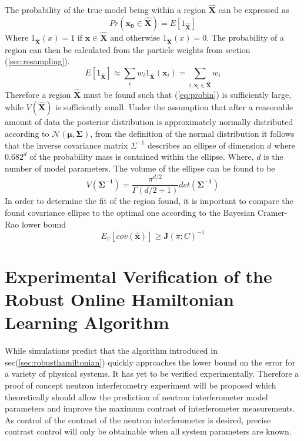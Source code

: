 The probability of the true model being within a region $\mathbf{\hat{X}}$ can be expressed as 
\begin{equation}
Pr(\mathbf{x_0}\in \mathbf{\hat{X}}) = E[1_{\mathbf{\hat{X}}}]
\end{equation}
Where $1_{\mathbf{\hat{X}}}(x) = 1$ if $\mathbf{x}\in \mathbf{\hat{X}}$ and otherwise $1_{\mathbf{\hat{X}}}(x) = 0$. 
The probability of a region can then be calculated from the particle weights from section (\ref{sec:resampling}). 
\begin{equation}
E[1_{\mathbf{\hat{X}}}] \approx \sum \limits_i w_i 1_{\mathbf{\hat{X}}}(\mathbf{x}_i) = \sum \limits_{i,\mathbf{x_i}\in\mathbf{\hat{X}}} w_i
\label{eq:probin}
\end{equation}
Therefore a region $\mathbf{\hat{X}}$ must be found such that (\ref{eq:probin}) is sufficiently large, while $V(\mathbf{\hat{X}})$ is sufficiently small. Under the assumption that after a reasonable amount of data the posterior distribution is approximately normally distributed according to $\mathcal{N}(\mathbf{\mu},\mathbf{\Sigma})$, from the definition of the normal distribution it follows that the inverse covariance matrix $\Sigma^{-1}$ describes an ellipse of dimension $d$ where $0.682^d$ of the probability mass is contained within the ellipse. Where, $d$ is the number of model parameters. 
The volume of the ellipse can be found to be 
\begin{equation}
V(\mathbf{\Sigma^{-1}}) = \frac{\pi^{d/2}}{\Gamma(d/2+1)}det(\mathbf{\Sigma^{-1}}) 
\end{equation}
In order to determine the fit of the region found, it is important to compare the found covariance ellipse to the optimal one according to the Bayesian Cramer-Rao lower bound 
\begin{equation*}
E_\pi [cov(\mathbf{\hat{x}})] \geq \mathbf{J}(\pi;C)^{-1}
\end{equation*}
\section{Experimental Verification of the Robust Online Hamiltonian Learning Algorithm}
While simulations predict that the algorithm introduced in sec(\ref{sec:robusthamiltonian}) quickly approaches the lower bound on the error for a variety of physical systems.\cite{hamiltonian_learning} It has yet to be verified experimentally. Therefore a proof of concept neutron interferometry experiment will be proposed which theoretically should allow the prediction of neutron interferometer model parameters and improve the maximum contrast of interferometer measurements. As control of the contrast of the neutron interferometer is desired, precise contrast control will only be obtainable when all system parameters are known. 
